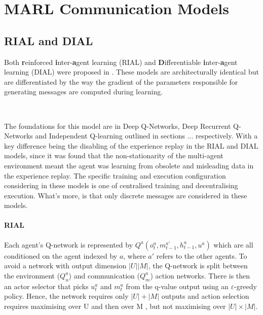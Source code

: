 \documentclass{article}
\begin{document}
\newpage



\newpage

\appendix

\section{MARL Communication Models} \label{sec:models}
\subsection{RIAL and DIAL}\label{subsec:dial_rial}

Both \textbf{r}einforced \textbf{i}nter-\textbf{a}gent learning (RIAL) and \textbf{D}ifferentiable \textbf{i}nter-\textbf{a}gent learning (DIAL) were proposed in \citet{foerster2016learning}. These models are architecturally identical but are differentiated by the way the gradient of the parameters responsible for generating messages are computed during learning.

\

The foundations for this model are in Deep Q-Networks, Deep Recurrent Q-Networks and Independent Q-learning outlined in sections ... respectively. With a key difference being the disabling of the experience replay in the RIAL and DIAL models, since it was found that the non-stationarity of the multi-agent environment meant the agent was learning from obsolete and misleading data in the experience replay. The specific training and execution configuration considering in these models is one of centralised training and decentralising execution. What's more, is that only discrete messages are considered in these models. 


\paragraph{RIAL} Each agent's Q-network is represented by $Q^a(o_t^a, m_{t-1}^{a'}, h_{t-1}^{a}, u^a)$ which are all conditioned on the agent indexed by $a$, where $a'$ refers to the other agents. To avoid a network with output dimension $|U||M|$, the Q-network is split between the environment ($Q^a_u$) and communication ($Q^a_m$) action networks. There is then an actor selector that picks $u_t^a$ and $m_t^a$ from the q-value output using an $\varepsilon$-greedy policy. Hence, the network requires only $|U| + |M|$ outputs and action selection requires maximising over U and then over M , but not maximising over $|U| \times |M|$.
\end{document}
